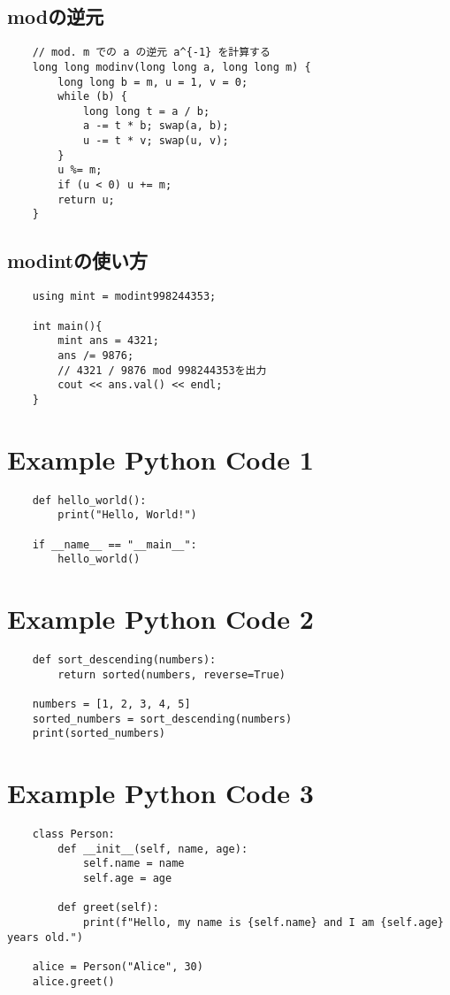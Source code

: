 \documentclass[a4paper, landscape, 9pt]{jarticle} %
\begin{document}
\begin{multicols*}{3}
    \subsection{modの逆元}
    \begin{lstlisting}
    // mod. m での a の逆元 a^{-1} を計算する
    long long modinv(long long a, long long m) {
        long long b = m, u = 1, v = 0;
        while (b) {
            long long t = a / b;
            a -= t * b; swap(a, b);
            u -= t * v; swap(u, v);
        }
        u %= m;
        if (u < 0) u += m;
        return u;
    }
    \end{lstlisting}

    \subsection{modintの使い方}
    \begin{lstlisting}
    using mint = modint998244353;

    int main(){
        mint ans = 4321;
        ans /= 9876;
        // 4321 / 9876 mod 998244353を出力
        cout << ans.val() << endl;
    }
    \end{lstlisting}


    \lstset{style=python}

    \section*{Example Python Code 1}
    \begin{lstlisting}
    def hello_world():
        print("Hello, World!")

    if __name__ == "__main__":
        hello_world()
    \end{lstlisting}

    \section*{Example Python Code 2}
    \begin{lstlisting}
    def sort_descending(numbers):
        return sorted(numbers, reverse=True)

    numbers = [1, 2, 3, 4, 5]
    sorted_numbers = sort_descending(numbers)
    print(sorted_numbers)
    \end{lstlisting}

    \section*{Example Python Code 3}
    \begin{lstlisting}
    class Person:
        def __init__(self, name, age):
            self.name = name
            self.age = age

        def greet(self):
            print(f"Hello, my name is {self.name} and I am {self.age} years old.")

    alice = Person("Alice", 30)
    alice.greet()
    \end{lstlisting}



    

\end{multicols*}
\end{document}
